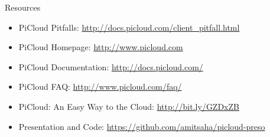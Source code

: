 \documentclass{beamer} \usepackage{fancyvrb} \usepackage{listings}
\begin{document}
      \begin{frame}{Resources}
        \begin{itemize}
        \item PiCloud Pitfalls:
          \url{http://docs.picloud.com/client_pitfall.html}
        \item PiCloud Homepage: \url{http://www.picloud.com}
        \item PiCloud Documentation: \url{http://docs.picloud.com/}
        \item PiCloud FAQ: \url{http://www.picloud.com/faq/}
        \item PiCloud: An Easy Way to the Cloud:
          \url{http://bit.ly/GZDxZB}
        \item Presentation and Code:
          \url{https://github.com/amitsaha/picloud-preso}
        \end{itemize}
      \end{frame}

      
\end{document}
